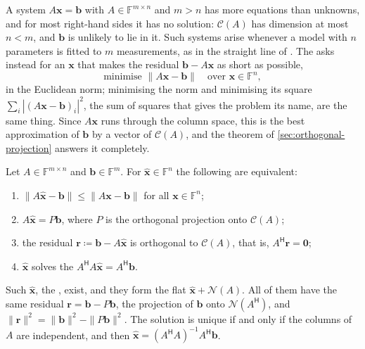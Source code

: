 A system $A\mathbf x=\mathbf b$ with $A\in\mathbb F^{m\times n}$ and $m>n$ has more equations than unknowns, and for most right-hand sides it has no solution: $\mathcal C(A)$ has dimension at most $n<m$, and $\mathbf b$ is unlikely to lie in it. Such systems arise whenever a model with $n$ parameters is fitted to $m$ measurements, as in the straight line of . The  asks instead for an $\mathbf x$ that makes the residual $\mathbf b-A\mathbf x$ as short as possible,
\[
\text{minimise }\|A\mathbf x-\mathbf b\|\quad\text{over }\mathbf x\in\mathbb F^n ,
\]
in the Euclidean norm; minimising the norm and minimising its square $\sum_i|(A\mathbf x-\mathbf b)_i|^2$, the sum of squares that gives the problem its name, are the same thing. Since $A\mathbf x$ runs through the column space, this is the best approximation of $\mathbf b$ by a vector of $\mathcal C(A)$, and the theorem of \cref{sec:orthogonal-projection} answers it completely.

\begin{theorem}
\label{thm:least-squares}
Let $A\in\mathbb F^{m\times n}$ and $\mathbf b\in\mathbb F^m$. For $\hat{\mathbf x}\in\mathbb F^n$ the following are equivalent:
\begin{enumerate}
\item $\|A\hat{\mathbf x}-\mathbf b\|\le\|A\mathbf x-\mathbf b\|$ for all $\mathbf x\in\mathbb F^n$;
\item $A\hat{\mathbf x}=P\mathbf b$, where $P$ is the orthogonal projection onto $\mathcal C(A)$;
\item the residual $\mathbf r\coloneqq\mathbf b-A\hat{\mathbf x}$ is orthogonal to $\mathcal C(A)$, that is, $A^{\mathsf H}\mathbf r=\mathbf 0$;
\item $\hat{\mathbf x}$ solves the  $A^{\mathsf H}A\hat{\mathbf x}=A^{\mathsf H}\mathbf b$.
\end{enumerate}
Such $\hat{\mathbf x}$, the , exist, and they form the flat $\hat{\mathbf x}+\mathcal N(A)$. All of them have the same residual $\mathbf r=\mathbf b-P\mathbf b$, the projection of $\mathbf b$ onto $\mathcal N(A^{\mathsf H})$, and $\|\mathbf r\|^2=\|\mathbf b\|^2-\|P\mathbf b\|^2$. The solution is unique if and only if the columns of $A$ are independent, and then $\hat{\mathbf x}=(A^{\mathsf H}A)^{-1}A^{\mathsf H}\mathbf b$.
\end{theorem}

